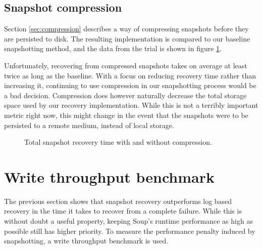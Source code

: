 \documentclass[b5paper]{report}
\begin{document}
\subsection{Snapshot compression}
Section \ref{sec:compression} describes a way of compressing snapshots before
they are persisted to disk. The resulting implementation is compared to our
baseline snapshotting method, and the data from the trial is shown in figure
\ref{fig:compression}.

Unfortunately, recovering from compressed snapshots takes on average at least
twice as long as the baseline. With a focus on reducing recovery time rather
than increasing it, continuing to use compression in our snapshotting process
would be a bad decision. Compression does however naturally decrease the total
storage space used by our recovery implementation. While this is not a terribly
important metric right now, this might change in the event that the snapshots
were to be persisted to a remote medium, instead of local storage.

\begin{figure}[H]
  \centering

  \caption{
    Total snapshot recovery time with and without compression.
    \label{fig:compression}
  }
\end{figure}

\section{Write throughput benchmark}
The previous section shows that snapshot recovery outperforms log based recovery
in the time it takes to recover from a complete failure. While this is without
doubt a useful property, keeping Soup's runtime performance as high as possible
still has higher priority. To measure the performance penalty induced by
snapshotting, a write throughput benchmark is used.
\end{document}
